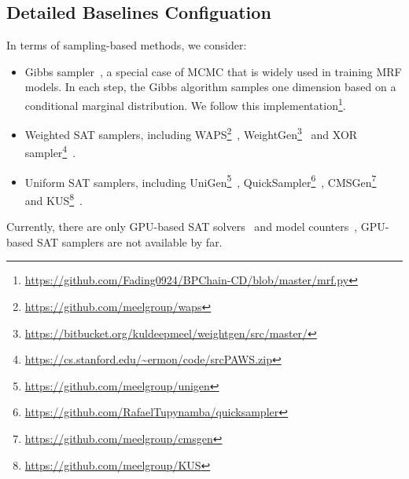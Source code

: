 \documentclass[letterpaper]{article} %
\begin{document}
\subsection{Detailed Baselines Configuation} 
In terms of sampling-based methods, we consider:
\begin{itemize}
\item Gibbs sampler~\cite{carter1994gibbs}, a special case of MCMC that is  widely used in training MRF models. In each step, the Gibbs algorithm samples 
one dimension based on a conditional marginal distribution. We follow this implementation\footnote{\url{https://github.com/Fading0924/BPChain-CD/blob/master/mrf.py}}.
    \item Weighted SAT samplers, including WAPS\footnote{\url{https://github.com/meelgroup/waps}}~\cite{DBLP:conf/tacas/GuptaSRM19}, WeightGen\footnote{\url{https://bitbucket.org/kuldeepmeel/weightgen/src/master/}}~\cite{DBLP:conf/aaai/ChakrabortyFMSV14} and XOR sampler\footnote{\url{https://cs.stanford.edu/~ermon/code/srcPAWS.zip}}~\cite{DBLP:conf/nips/ErmonGSS13,DBLP:conf/uai/DingX21}.
    \item Uniform SAT samplers, including UniGen\footnote{\url{https://github.com/meelgroup/unigen}}~\cite{DBLP:conf/cav/SoosGM20}, QuickSampler\footnote{\url{https://github.com/RafaelTupynamba/quicksampler}}~\cite{DBLP:conf/icse/DutraLBS18}, CMSGen\footnote{\url{https://github.com/meelgroup/cmsgen}}~\cite{DBLP:conf/fmcad/GoliaSCM21} and KUS\footnote{\url{https://github.com/meelgroup/KUS}}~\cite{DBLP:conf/lpar/SharmaGRM18}.
\end{itemize}
Currently, there are only GPU-based SAT solvers~\cite{DBLP:conf/sat/PrevotSM21,mahmoud2022gpu} and model counters~\cite{DBLP:conf/cp/FichteHZ19}, GPU-based SAT samplers are not available by far.
\end{document}

